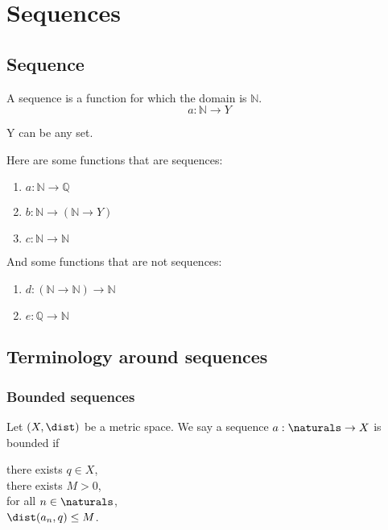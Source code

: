 \section{Sequences}

\subsection{Sequence}
\begin{definition}[Sequence]
    A sequence is a function for which the domain is $\mathbb{N}$.
    $$a: \mathbb{N} \to Y$$

    Y can be any set.
\end{definition}

\begin{example}
    Here are some functions that are sequences:
    \begin{enumerate}
        \item $a: \mathbb{N} \to \mathbb{Q}$
        \item $b: \mathbb{N} \to (\mathbb{N} \to Y)$
        \item $c: \mathbb{N} \to \mathbb{N}$
    \end{enumerate}

    And some functions that are not sequences:
    \begin{enumerate}
        \item $d: (\mathbb{N} \to \mathbb{N}) \to \mathbb{N}$
        \item $e: \mathbb{Q} \to \mathbb{N}$
    \end{enumerate}
\end{example}

\subsection{Terminology around sequences}
\subsubsection{Bounded sequences}
\begin{definition}
    Let $(X, \dist)$ be a metric space. We say a sequence $a: \naturals \to X$ is bounded if
    \begin{center}
        \parbox{\linewidth}{
            \linewidth
            there exists $q \in X$, \\
            \tab there exists $M > 0$, \\
            \tab\tab for all $n \in \naturals$, \\
            \tab\tab\tab $\dist(a_n,q) \le M$.
        }
    \end{center}
\end{definition}

